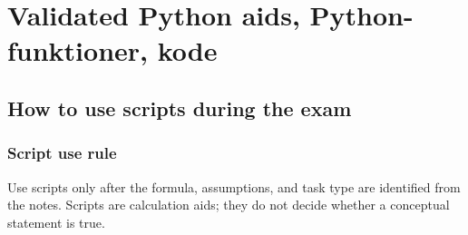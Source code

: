 \section{Validated Python aids, Python-funktioner, kode}

\subsection{How to use scripts during the exam}

\subsubsection{Script use rule}
Use scripts only after the formula, assumptions, and task type are identified from the notes. Scripts are calculation aids; they do not decide whether a conceptual statement is true.

